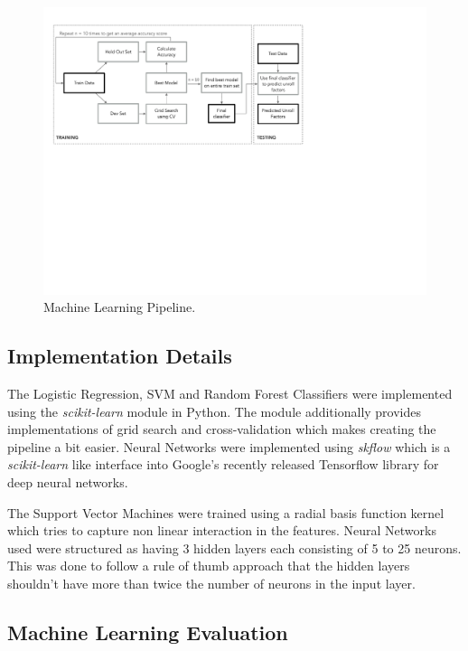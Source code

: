 \documentclass[]{sig-alternate}
\begin{document}
\begin{figure}
  \center
  \includegraphics[width=0.9\linewidth]{fig/mlPipeline.pdf}
  \caption{Machine Learning Pipeline.}
  \label{fig:mlPipeline}
\end{figure}


\subsection{Implementation Details}
\label{subsec:ImplementationDetails}

The Logistic Regression, SVM and Random Forest Classifiers were implemented using the \emph{scikit-learn} module in Python. The module additionally provides implementations of grid search and cross-validation which makes creating the pipeline a bit easier. Neural Networks were implemented using \emph{skflow} which is a \emph{scikit-learn} like interface into Google's recently released Tensorflow library for deep neural networks. 

The Support Vector Machines were trained using a radial basis function kernel which tries to capture non linear interaction in the features. Neural Networks used were structured as having 3 hidden layers each consisting of 5 to 25 neurons. This was done to follow a rule of thumb approach that the hidden layers shouldn't have more than twice the number of neurons in the input layer.


\subsection{Machine Learning Evaluation}
\label{subsec:MachineLearningEvaluation}
\end{document}
